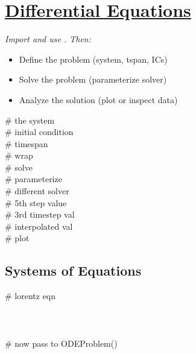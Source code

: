 \section{\href{https://docs.sciml.ai/stable/}{Differential Equations}}
\textit{Import and use . Then:}
\begin{itemize}
    \item Define the problem (system, tspan, ICs)
    \item Solve the problem (parameterize solver)
    \item Analyze the solution (plot or inspect data)
\end{itemize}

 \# the system \\
 \# initial condition \\
 \# timespan \\
 \# wrap \\
 \# solve \\
 \# parameterize\\
 \# different solver \\
 \# 5th step value\\
 \# 3rd timestep val\\
 \# interpolated val\\
 \# plot \\[2mm]


\subsection*{Systems of Equations}
 \# lorentz eqn\\
 \\
 \\
 \\
 \# now pass to ODEProblem()\\

